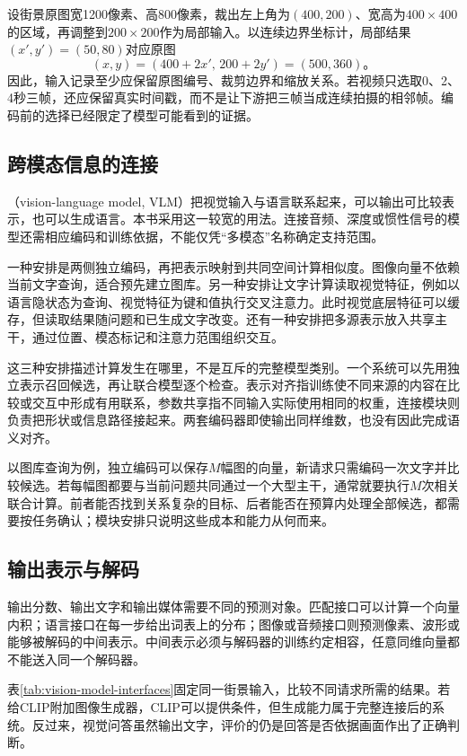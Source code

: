 设街景原图宽1200像素、高800像素，裁出左上角为$(400,200)$、宽高为$400\times400$的区域，再调整到$200\times200$作为局部输入。以连续边界坐标计，局部结果$(x',y')=(50,80)$对应原图
\[
  (x,y)=(400+2x',\,200+2y')=(500,360)\text{。}
\]
因此，输入记录至少应保留原图编号、裁剪边界和缩放关系。若视频只选取0、2、4秒三帧，还应保留真实时间戳，而不是让下游把三帧当成连续拍摄的相邻帧。编码前的选择已经限定了模型可能看到的证据。

\subsection{跨模态信息的连接}
\label{sec:vision-models-connection}

（vision-language model, VLM）把视觉输入与语言联系起来，可以输出可比较表示，也可以生成语言。本书采用这一较宽的用法。连接音频、深度或惯性信号的模型还需相应编码和训练依据，不能仅凭“多模态”名称确定支持范围。

一种安排是两侧独立编码，再把表示映射到共同空间计算相似度。图像向量不依赖当前文字查询，适合预先建立图库。另一种安排让文字计算读取视觉特征，例如以语言隐状态为查询、视觉特征为键和值执行交叉注意力。此时视觉底层特征可以缓存，但读取结果随问题和已生成文字改变。还有一种安排把多源表示放入共享主干，通过位置、模态标记和注意力范围组织交互。

这三种安排描述计算发生在哪里，不是互斥的完整模型类别。一个系统可以先用独立表示召回候选，再让联合模型逐个检查。表示对齐指训练使不同来源的内容在比较或交互中形成有用联系，参数共享指不同输入实际使用相同的权重，连接模块则负责把形状或信息路径接起来。两套编码器即使输出同样维数，也没有因此完成语义对齐。

以图库查询为例，独立编码可以保存$M$幅图的向量，新请求只需编码一次文字并比较候选。若每幅图都要与当前问题共同通过一个大型主干，通常就要执行$M$次相关联合计算。前者能否找到关系复杂的目标、后者能否在预算内处理全部候选，都需要按任务确认；模块安排只说明这些成本和能力从何而来。

\subsection{输出表示与解码}
\label{sec:vision-models-output}

输出分数、输出文字和输出媒体需要不同的预测对象。匹配接口可以计算一个向量内积；语言接口在每一步给出词表上的分布；图像或音频接口则预测像素、波形或能够被解码的中间表示。中间表示必须与解码器的训练约定相容，任意同维向量都不能送入同一个解码器。

表\ref{tab:vision-model-interfaces}固定同一街景输入，比较不同请求所需的结果。若给CLIP附加图像生成器，CLIP可以提供条件，但生成能力属于完整连接后的系统。反过来，视觉问答虽然输出文字，评价的仍是回答是否依据画面作出了正确判断。

